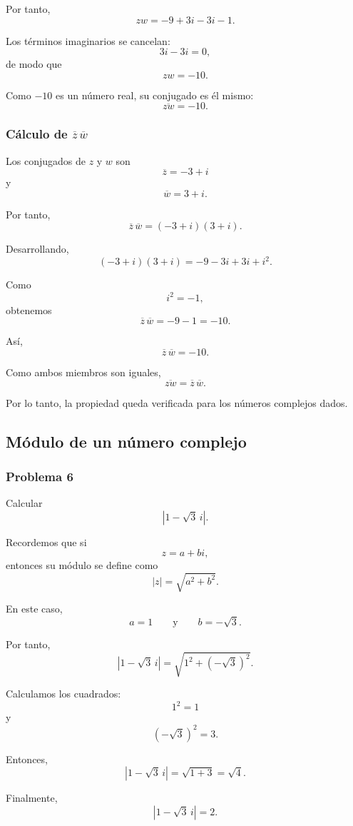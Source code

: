 \documentclass[12pt]{article}
\begin{document}
Por tanto,
\[
zw=-9+3i-3i-1.
\]

Los términos imaginarios se cancelan:
\[
3i-3i=0,
\]
de modo que
\[
zw=-10.
\]

Como $-10$ es un número real, su conjugado es él mismo:
\[
\boxed{\overline{zw}=-10}.
\]

\subsubsection*{Cálculo de $\overline z\,\overline w$}

Los conjugados de $z$ y $w$ son
\[
\overline z=-3+i
\]
y
\[
\overline w=3+i.
\]

Por tanto,
\[
\overline z\,\overline w
=
(-3+i)(3+i).
\]

Desarrollando,
\[
(-3+i)(3+i)
=
-9-3i+3i+i^2.
\]

Como
\[
i^2=-1,
\]
obtenemos
\[
\overline z\,\overline w
=
-9-1
=
-10.
\]

Así,
\[
\boxed{\overline z\,\overline w=-10}.
\]

Como ambos miembros son iguales,
\[
\boxed{
\overline{zw}=\overline z\,\overline w
}.
\]

Por lo tanto, la propiedad queda verificada para los números complejos dados.

\subsection{Módulo de un número complejo}

\subsubsection*{Problema 6}

Calcular
\[
\left|1-\sqrt3\,i\right|.
\]

Recordemos que si
\[
z=a+bi,
\]
entonces su módulo se define como
\[
|z|=\sqrt{a^2+b^2}.
\]

En este caso,
\[
a=1
\qquad\text{y}\qquad
b=-\sqrt3.
\]

Por tanto,
\[
\left|1-\sqrt3\,i\right|
=
\sqrt{1^2+(-\sqrt3)^2}.
\]

Calculamos los cuadrados:
\[
1^2=1
\]
y
\[
(-\sqrt3)^2=3.
\]

Entonces,
\[
\left|1-\sqrt3\,i\right|
=
\sqrt{1+3}
=
\sqrt4.
\]

Finalmente,
\[
\boxed{
\left|1-\sqrt3\,i\right|=2
}.
\]
\end{document}
